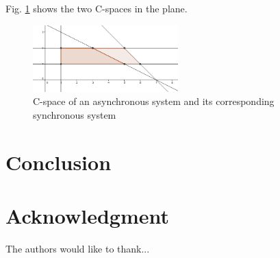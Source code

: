 \documentclass[conference]{IEEEtran}
\begin{document}
Fig. \ref{fig:cspaceComp} shows the two C-spaces in the plane.

\begin{figure}[h]
\begin{center}
  \includegraphics[width=0.5\textwidth]{figs/cspace_example.png}
  \caption{C-space of an asynchronous system and its corresponding synchronous system}
  \label{fig:cspaceComp}
\end{center}
\end{figure}

\section{Conclusion}




\section*{Acknowledgment}


The authors would like to thank...







%
%
%




\end{document}
